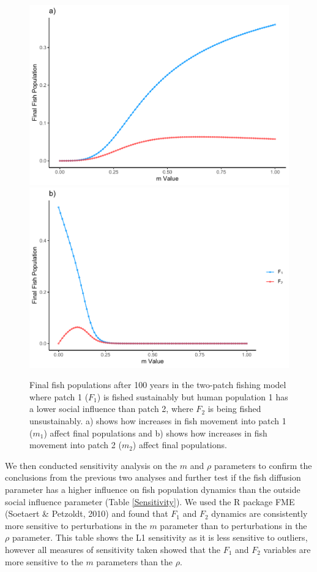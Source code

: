 \documentclass[
]{article}
\begin{document}
\begin{figure}
\includegraphics[width=0.5\linewidth]{Wulfing_Thesis_files/figure-latex/mExploreGraph-1} \includegraphics[width=0.5\linewidth]{Wulfing_Thesis_files/figure-latex/mExploreGraph-2} \caption{Final fish populations after 100 years in the two-patch fishing model where patch 1 (\(F_1\)) is fished sustainably but human population 1 has a lower social influence than patch 2, where \(F_2\) is being fished unsustainably. a) shows how increases in fish movement into patch 1 (\(m_1\)) affect final populations and b) shows how increases in fish movement into patch 2 (\(m_2\)) affect final populations. \label{mExploreGraph}}\label{fig:mExploreGraph}
\end{figure}

We then conducted sensitivity analysis on the \(m\) and \(\rho\) parameters to confirm the conclusions from the previous two analyses and further test if the fish diffusion parameter has a higher influence on fish population dynamics than the outside social influence parameter (Table \ref{Sensitivity}). We used the R package FME (Soetaert \& Petzoldt, 2010) and found that \(F_1\) and \(F_2\) dynamics are consistently more sensitive to perturbations in the \(m\) parameter than to perturbations in the \(\rho\) parameter. This table shows the L1 sensitivity as it is less sensitive to outliers, however all measures of sensitivity taken showed that the \(F_1\) and \(F_2\) variables are more sensitive to the \(m\) parameters than the \(\rho\).
\end{document}
